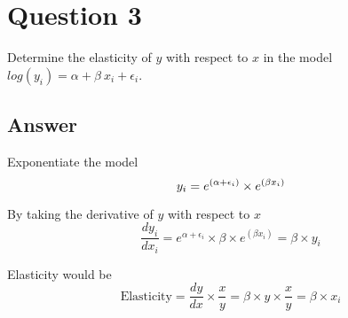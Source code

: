 \documentclass[12pt]{article}
\begin{document}
\section*{Question 3}
Determine the elasticity of $y$ with respect to $x$ in the model $log(y_i) = \alpha + \beta\ x_i + \epsilon_i$.

\subsection*{Answer}
Exponentiate the model
\[
    y_i = e^{(\alpha + \epsilon_i)} \times e^{(\beta x_i)}\\
\]

By taking the derivative of $y$ with respect to $x$
\[
    \frac{d y_i}{d x_i} = e^{\alpha + \epsilon_i} \times \beta \times e^{(\beta x_i)} = \beta \times y_i
\]

Elasticity would be
\[
    \text{Elasticity} = \frac{dy}{dx} \times \frac{x}{y} = \beta \times y \times \frac{x}{y} = \beta \times x_i
\]
\end{document}
